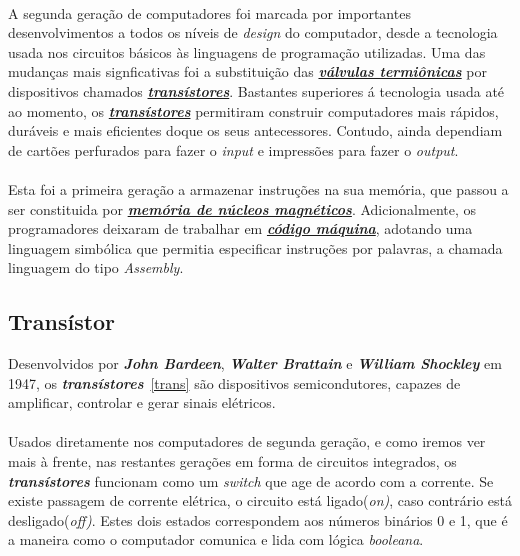 \documentclass{report}
\begin{document}
\paragraph{}
A segunda geração de computadores foi marcada por importantes desenvolvimentos a todos os níveis de \textit{design} do computador, desde a tecnologia usada nos circuitos básicos às linguagens de programação utilizadas.
Uma das mudanças mais signficativas foi a substituição das \hyperref[sec:valvulas]{\textbf{\textit{válvulas termiônicas}}} por dispositivos chamados \hyperref[sec:transistor]{\textbf{\textit{transístores}}}. Bastantes superiores á tecnologia usada até ao momento, os \hyperref[sec:transistor]{\textbf{\textit{transístores}}} permitiram construir computadores mais rápidos, duráveis e mais eficientes doque os seus antecessores. Contudo, ainda dependiam de cartões perfurados para fazer o \textit{input} e impressões para fazer o \textit{output}.
\paragraph{}
Esta foi a primeira geração a armazenar instruções na sua memória, que passou a ser constituida por \hyperref[sec:nucleo]{\textbf{\textit{memória de núcleos magnéticos}}}. Adicionalmente, os programadores deixaram de trabalhar em \hyperref[sec:codigo]{\textbf{\textit{código máquina}}}, adotando uma linguagem simbólica que permitia especificar instruções por palavras, a chamada linguagem do tipo \textit{Assembly}.

\newpage

\subsection{Transístor}
\label{sec:transistor}
Desenvolvidos por \textbf{\textit{John Bardeen}}, \textbf{\textit{Walter Brattain}} e \textbf{\textit{William Shockley}} em 1947, os \textbf{\textit{transístores}}~\ref{trans} \cite{Transistores} são dispositivos semicondutores, capazes de amplificar, controlar e gerar sinais elétricos. 
\paragraph{}
Usados diretamente nos computadores de segunda geração, e como iremos ver mais à frente, nas restantes gerações em forma de circuitos integrados, os \textbf{\textit{transístores}} funcionam como um \textit{switch} que age de acordo com a corrente. Se existe passagem de corrente elétrica, o circuito está ligado(\textit{on)}, caso contrário está desligado(\textit{off)}. Estes dois estados  correspondem aos números binários 0 e 1, que é a maneira como o computador comunica e lida com lógica \textit{booleana}.
\end{document}
